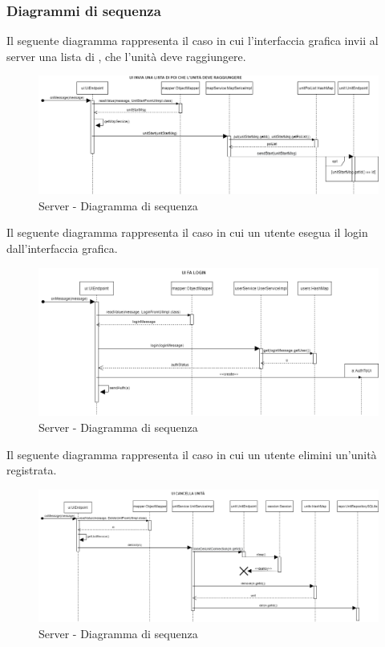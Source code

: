 \subsubsection{Diagrammi di sequenza}
Il seguente diagramma rappresenta il caso in cui l'interfaccia grafica invii al server una lista di , che l'unità deve raggiungere.
\begin{figure}[H]
	\centering
	\includegraphics[width=13cm]{img/server_seq1.png}
	\caption{Server - Diagramma di sequenza}
\end{figure}
Il seguente diagramma rappresenta il caso in cui un utente esegua il login dall'interfaccia grafica.
\begin{figure}[H]
	\centering
	\includegraphics[width=13cm]{img/server_seq2.png}
	\caption{Server - Diagramma di sequenza}
\end{figure}
Il seguente diagramma rappresenta il caso in cui un utente elimini un'unità registrata.
\begin{figure}[H]
	\centering
	\includegraphics[width=13cm]{img/server_seq3.png}
	\caption{Server - Diagramma di sequenza}
\end{figure}